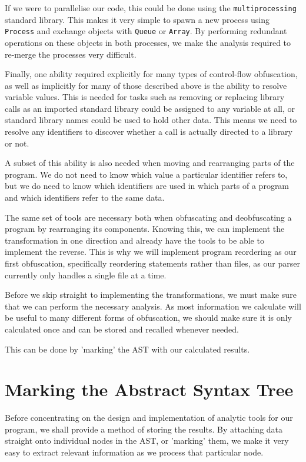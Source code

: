 \documentclass{report}
\begin{document}
If we were to parallelise our code, this could be done using the \texttt{multiprocessing} standard library. This makes it
very simple to spawn a new process using \texttt{Process} and exchange objects with \texttt{Queue} or \texttt{Array}. By
performing redundant operations on these objects in both processes, we make the analysis required to re-merge the processes
very difficult.

Finally, one ability required explicitly for many types of control-flow obfuscation, as well as implicitly for many of those
described above is the ability to resolve variable values. This is needed for tasks such as removing or replacing library calls
as an imported standard library could be assigned to any variable at all, or standard library names could be used to hold other
data. This means we need to resolve any identifiers to discover whether a call is actually directed to a library or not.

A subset of this ability is also needed when moving and rearranging parts of the program. We do not need to know which value a
particular identifier refers to, but we do need to know which identifiers are used in which parts of a program and which
identifiers refer to the same data.

The same set of tools are necessary both when obfuscating and deobfuscating a program by rearranging its components. Knowing
this, we can implement the transformation in one direction and already have the tools to be able to implement the reverse.
This is why we will implement program reordering as our first obfuscation, specifically reordering statements rather than
files, as our parser currently only handles a single file at a time.

Before we skip straight to implementing the transformations, we must make sure that we can perform the necessary analysis. As
most information we calculate will be useful to many different forms of obfuscation, we should make sure it is only calculated
once and can be stored and recalled whenever needed.

This can be done by 'marking' the AST with our calculated results.

\section{Marking the Abstract Syntax Tree}

Before concentrating on the design and implementation of analytic tools for our program, we shall provide a method of storing
the results. By attaching data straight onto individual nodes in the AST, or 'marking' them, we make it very easy to extract
relevant information as we process that particular node.
\end{document}
